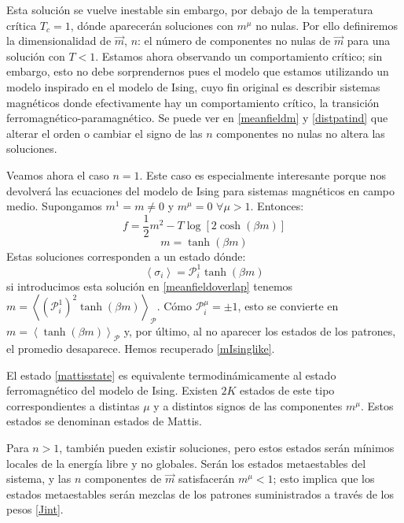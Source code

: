 \documentclass[titlepage,12pt]{article}
\numberwithin{equation}{section}
\begin{document}
	Esta solución se vuelve inestable sin embargo, por debajo de la temperatura crítica $T_c=1$, dónde aparecerán soluciones con $m^\mu$ no nulas. Por ello definiremos la dimensionalidad de $\vec{m}$, $n$: el número de componentes no nulas de $\vec{m}$ para una solución con $T<1$. Estamos ahora observando un comportamiento crítico; sin embargo, esto no debe sorprendernos pues el modelo que estamos utilizando un modelo inspirado en el modelo de Ising, cuyo fin original es describir sistemas magnéticos donde efectivamente hay un comportamiento crítico, la transición ferromagnético-paramagnético. Se puede ver en \eqref{meanfieldm} y \eqref{distpatind} que alterar el orden o cambiar el signo de las $n$ componentes no nulas no altera las soluciones.
	
	Veamos ahora el caso $n=1$. Este caso es especialmente interesante porque nos devolverá las ecuaciones del modelo de Ising para sistemas magnéticos en campo medio. Supongamos $m^1=m\neq0$ y $m^\mu = 0\,\,\forall \mu>1$. Entonces:
	\begin{equation}
	f=\frac{1}{2}m^2 - T\log\left[2\cosh(\beta m)\right]
	\label{fIsinglike}
	\end{equation}
	\begin{equation}
	m=\tanh(\beta m)
	\label{mIsinglike}
	\end{equation}
	Estas soluciones corresponden a un estado dónde:
	\begin{equation}
	\left<\sigma_i\right>=\mathcal{P}_i^1\tanh(\beta m)
	\label{mattisstate}
	\end{equation}
	si introducimos esta solución en \eqref{meanfieldoverlap} tenemos $m=\left<(\mathcal{P}_i^1)^2\tanh(\beta m)\right>_{\mathcal{P}}$. Cómo $\mathcal{P}^\mu_i=\pm 1$, esto se convierte en $m=\left<\tanh(\beta m)\right>_{\mathcal{P}}$ y, por último, al no aparecer los estados de los patrones, el promedio desaparece. Hemos recuperado \eqref{mIsinglike}. 
	
	El estado \eqref{mattisstate} es equivalente termodinámicamente al estado ferromagnético del modelo de Ising. Existen $2K$ estados de este tipo correspondientes a distintas $\mu$ y a distintos signos de las componentes $m^\mu$. Estos estados se denominan estados de Mattis.
	
	Para $n>1$, también pueden existir soluciones, pero estos estados serán mínimos locales de la energía libre y no globales. Serán los estados metaestables del sistema, y las $n$ componentes de $\vec{m}$ satisfacerán $m^\mu<1$; esto implica que los estados metaestables serán mezclas de los patrones suministrados a través de los pesos \eqref{Jint}.
\end{document}
